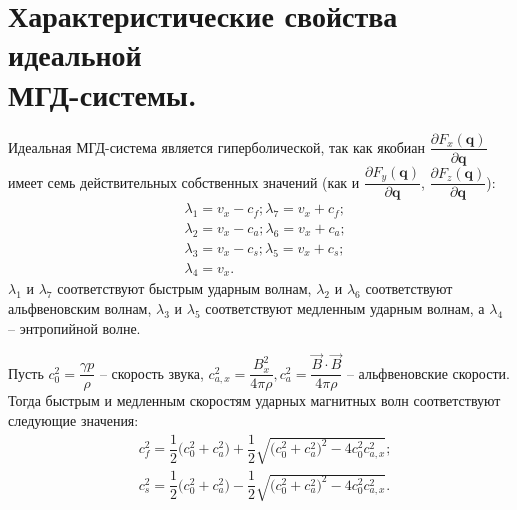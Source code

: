 \documentclass[14pt, a4paper, fleqn]{extreport}
\begin{document}
	\section{Характеристические свойства идеальной \\
		     МГД-системы.}
	
	Идеальная МГД-система является гиперболической,
	так как якобиан $\dfrac{\partial F_x(\textbf{q})}{\partial \textbf{q}}$
	имеет семь действительных собственных значений
	(как и 
	$\dfrac{\partial F_y(\textbf{q})}{\partial \textbf{q}}$,
	$\dfrac{\partial F_z(\textbf{q})}{\partial \textbf{q}}$):
	\begin{equation*}
	\begin{split}
		&\lambda_1 = v_x - c_f; \lambda_7 = v_x + c_f; \\
		&\lambda_2 = v_x - c_a; \lambda_6 = v_x + c_a; \\
		&\lambda_3 = v_x - c_s; \lambda_5 = v_x + c_s; \\
		&\lambda_4 = v_x.
	\end{split}
	\end{equation*}
	$\lambda_1$ и $\lambda_7$ соответствуют быстрым ударным волнам,
	$\lambda_2$ и $\lambda_6$ соответствуют альфвеновским волнам,
	$\lambda_3$ и $\lambda_5$ соответствуют медленным ударным волнам, а
	$\lambda_4$ -- энтропийной волне.
	
	Пусть 
	$c_0^2 = \dfrac{\gamma p}{\rho}$ -- скорость звука,
	$c_{a,x}^2 = \dfrac{B_x^2}{4\pi\rho}, 
	 c_a^2 = \dfrac{\vec{B}\cdot\vec{B}}{4\pi\rho}$ -- альфвеновские скорости.
	Тогда быстрым и медленным скоростям ударных магнитных волн соответствуют следующие значения:
	\begin{equation*}
	\begin{split}
		&c_f^2 
			= \dfrac{1}{2}\big( c_0^2 + c_a^2 \big)	
			+ \dfrac{1}{2}\sqrt{ \big( c_0^2 + c_a^2 \big)^2 - 4c_0^2 c_{a,x}^2 }; \\
		&c_s^2 
			= \dfrac{1}{2}\big( c_0^2 + c_a^2 \big)	
			- \dfrac{1}{2}\sqrt{ \big( c_0^2 + c_a^2 \big)^2 - 4c_0^2 c_{a,x}^2 }. \\
	\end{split}
	\end{equation*}
	
	
	
	
\end{document}
